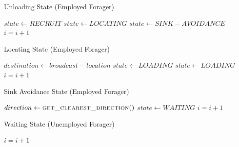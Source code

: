 \begin{algorithm}
\caption{Unloading State (Employed Forager)}
\label{algorithm:employedforager:unloading}
\begin{algorithmic}[1]
		\State {}
		\If{$\mu > \phi$}
			\State $state \gets RECRUIT$
		\Else
			\State $state \gets LOCATING$
		\EndIf
	\Else
		\State $state \gets SINK-AVOIDANCE$ 
	\EndIf
	\State $i =i + 1$
\EndFunction

\end{algorithmic}
\end{algorithm}

\begin{algorithm}
\caption{Locating State (Employed Forager)}
\label{algorithm:employedforager:locating}
\begin{algorithmic}[1]
		\State $destination \gets broadcast - location$
	\EndIf
	\State {}
	\State {}
		\State $state \gets LOADING$
		\State $state \gets LOADING$
	\EndIf
	\State $i =i + 1$
\EndFunction
\end{algorithmic}
\end{algorithm}

\begin{algorithm}
\caption{Sink Avoidance State (Employed Forager)}
\label{algorithm:sinkavoidance}
\begin{algorithmic}[1]
	\State $direction \gets \Call{get\_clearest\_direction}{ }$ 
	\State {}
\Else
	\State $state \gets WAITING$
\EndIf
\State $i =i + 1$
\EndFunction
\end{algorithmic}
\end{algorithm}
\begin{algorithm}
\caption{Waiting State (Unemployed Forager)}
\label{algorithm:unemployedforager:locating}
\begin{algorithmic}[1]
	\State {} 
 
\Else
	\State {}
\EndIf
\State $i =i + 1$
\EndFunction
\end{algorithmic}
\end{algorithm}

